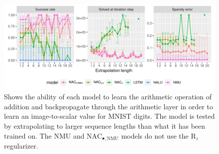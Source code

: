 \begin{figure}[H]
\centering
\includegraphics[width=\linewidth,trim={0 0.5cm 0 0},clip]{results/sequential_mnist_prod_long_ablation.pdf}
\caption{Shows the ability of each model to learn the arithmetic operation of addition and backpropagate through the arithmetic layer in order to learn an image-to-scalar value for MNIST digits. The model is tested by extrapolating to larger sequence lengths than what it has been trained on. The NMU and $\mathrm{NAC}_{\bullet,\mathrm{NMU}}$ models do not use the $\mathrm{R}_z$ regularizer.} 
\label{fig:sequential-mnist-prod-ablation}
\end{figure}